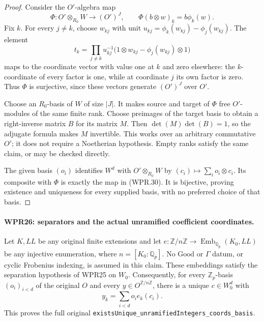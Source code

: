 \begin{proof}
Consider the $O'$-algebra map
\[
 \Phi:O'\otimes_{R_0}W\longrightarrow(O')^J,
 \qquad \Phi(b\otimes w)_k=b\phi_k(w).
\]
Fix $k$. For every $j\ne k$, choose $w_{kj}$ with unit
$u_{kj}=\phi_k(w_{kj})-\phi_j(w_{kj})$. The element
\[
 t_k=\prod_{j\ne k}u_{kj}^{-1}
        \bigl(1\otimes w_{kj}-\phi_j(w_{kj})\otimes1\bigr)
\]
maps to the coordinate vector with value one at $k$ and zero
elsewhere: the $k$-coordinate of every factor is one, while
at coordinate $j$ its own factor is zero. Thus $\Phi$ is
surjective, since these vectors generate $(O')^J$ over $O'$.

Choose an $R_0$-basis of $W$ of size $|J|$. It makes source
and target of $\Phi$ free $O'$-modules of the same finite rank.
Choose preimages of the target basis to obtain a right-inverse
matrix $B$ for its matrix $M$. Then
$\det(M)\det(B)=1$, so the adjugate formula makes $M$ invertible.
This works over an arbitrary commutative $O'$; it does not
require a Noetherian hypothesis. Empty ranks satisfy the same
claim, or may be checked directly.

The given basis $(o_i)$ identifies $W^d$ with
$O'\otimes_{R_0}W$ by $(c_i)\mapsto\sum_i o_i\otimes c_i$.
Its composite with $\Phi$ is exactly the map in (WPR.30).
It is bijective, proving existence and uniqueness for every
supplied basis, with no preferred choice of that basis.
\end{proof}

\paragraph{WPR26: separators and the actual unramified coefficient coordinates.}
\label{claim:WPR26}
Let $K,LL$ be any original finite extensions and let
$e:\mathbb Z/n\mathbb Z\to\operatorname{Emb}_{\mathbb Q_p}(K_0,LL)$
be any injective enumeration, where $n=[K_0:\mathbb Q_p]$.
No $\mathrm{Good}$ or $\Gamma$ datum, or cyclic Frobenius
indexing, is assumed in this claim. These embeddings satisfy
the separation hypothesis of WPR25 on $W_0$. Consequently,
for every $\mathbb Z_p$-basis
$(o_i)_{i<d}$ of the original $O$ and every $y\in O^{\mathbb Z/n\mathbb Z}$,
there is a unique $c\in W_0^d$ with
\[
                    y_k=\sum_{i<d}o_i e_k(c_i).
 \tag{WPR.31}
\]
This proves the full original
\texttt{existsUnique\_unramifiedIntegers\_coords\_basis}.


